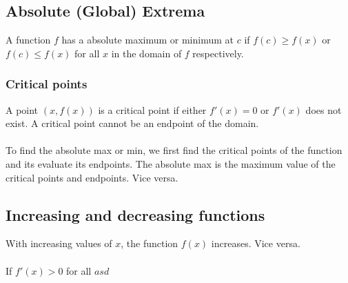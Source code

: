 \documentclass[10pt,a4paper]{article}
\begin{document}
\subsection{Absolute (Global) Extrema}
A function $f$ has a absolute maximum or minimum at $c$ if $f(c)\geq f(x)$ or $f(c)\leq f(x)$ for all $x$ in the domain of $f$ respectively.
\subsubsection{Critical points}
A point $(x, f(x))$ is a critical point if either $f'(x)=0$ or $f'(x)$ does not exist. A critical point cannot be an endpoint of the domain.
\\\\
To find the absolute max or min, we first find the critical points of the function and its evaluate its endpoints. The absolute max is the maximum value of the critical points and endpoints. Vice versa.  
\subsection{Increasing and decreasing functions}
With increasing values of $x$, the function $f(x)$ increases. Vice versa.
\\\\
If $f'(x)>0$ for all $asd$
\vfill
{}
\end{document}
